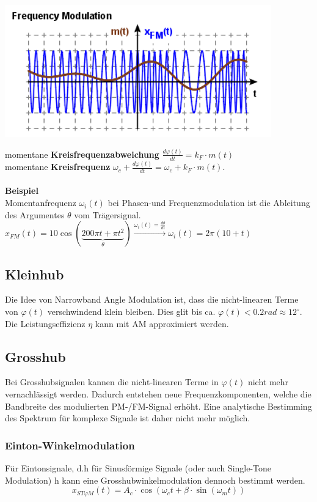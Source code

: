 \begin{center}
	\includegraphics[width=0.6\columnwidth]{Images/fm}
\end{center}

\noindent momentane \textbf{Kreisfrequenzabweichung} $\frac{d\varphi(t)}{dt} = k_F \cdot m(t)$\\ 
\noindent momentane \textbf{Kreisfrequenz} $\omega_c + \frac{d\varphi(t)}{dt} = \omega_c + k_F\cdot m(t)$.
~\\ ~\\
\noindent\textbf{Beispiel}\\
Momentanfrequenz $\omega_i(t)$ bei Phasen-und Frequenzmodulation ist die Ableitung des Argumentes $\theta$ vom Trägersignal.\\ $x_{FM}(t) = 10\cos(\underbrace{200\pi t + \pi t^2}_\theta) \xrightarrow{\omega_i(t) = \frac{d\theta}{dt}} \omega_i(t) = 2\pi (10 + t)$

\subsection{Kleinhub}
Die Idee von Narrowband Angle Modulation ist, dass die nicht-linearen Terme von $\varphi(t)$ verschwindend klein bleiben. Dies glit bis ca. $\varphi(t) < 0.2rad \approx 12^\circ$. Die Leistungseffizienz $\eta$ kann mit AM approximiert werden.

\subsection{Grosshub}
Bei Grosshubsignalen kannen die nicht-linearen Terme in $\varphi(t)$ nicht mehr vernachlässigt werden. Dadurch entstehen neue Frequenzkomponenten, welche die Bandbreite des modulierten PM-/FM-Signal erhöht. Eine analytische Bestimming des Spektrum für komplexe Signale ist daher nicht mehr möglich. ~\\

\subsubsection{Einton-Winkelmodulation}
Für Eintonsignale, d.h für Sinusförmige Signale (oder auch Single-Tone Modulation) h kann eine Grosshubwinkelmodulation dennoch bestimmt werden.
\[
x_{ST\varphi M}(t) = A_c\cdot \cos(\omega_ct + \beta\cdot \sin(\omega_mt))
\]

